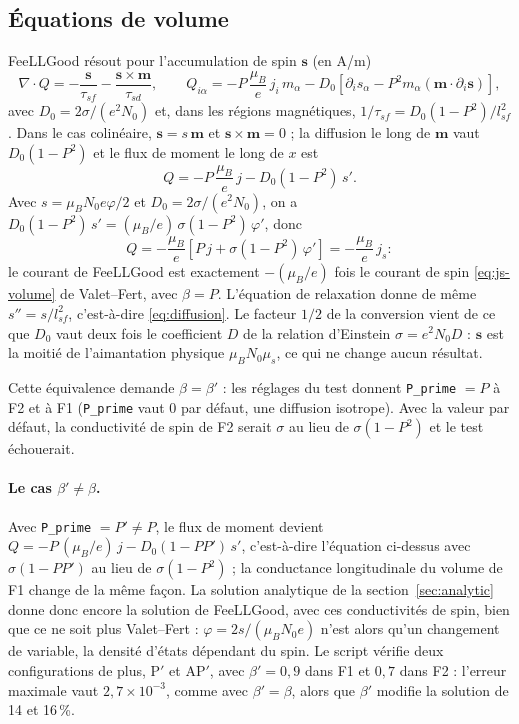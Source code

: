 \documentclass[11pt,a4paper]{article}
\newcommand{\vm}{\bm{m}}
\newcommand{\vs}{\bm{s}}
\begin{document}
\subsection{Équations de volume}
\label{sec:conversion}

FeeLLGood résout pour l'accumulation de spin $\vs$ (en A/m)
\begin{equation}
  \nabla\cdot Q = -\frac{\vs}{\tau_{sf}} - \frac{\vs\times\vm}{\tau_{sd}},
  \qquad
  Q_{i\alpha} = -P\,\frac{\mu_B}{e}\,j_i\,m_\alpha
  - D_0\left[\partial_i s_\alpha - P^2 m_\alpha(\vm\cdot\partial_i\vs)\right],
\end{equation}
avec $D_0 = 2\sigma/(e^2N_0)$ et, dans les régions magnétiques,
$1/\tau_{sf} = D_0(1-P^2)/l_{sf}^2$. Dans le cas colinéaire,
$\vs = s\,\vm$ et $\vs\times\vm = 0$ ; la diffusion le long de $\vm$ vaut
$D_0(1-P^2)$ et le flux de moment le long de $x$ est
\begin{equation}
  Q = -P\,\frac{\mu_B}{e}\,j - D_0(1-P^2)\,s' .
\end{equation}
Avec $s = \mu_BN_0e\varphi/2$ et $D_0 = 2\sigma/(e^2N_0)$, on a
$D_0(1-P^2)\,s' = (\mu_B/e)\,\sigma(1-P^2)\,\varphi'$, donc
\begin{equation}
  Q = -\frac{\mu_B}{e}\left[P\,j + \sigma(1-P^2)\,\varphi'\right]
    = -\frac{\mu_B}{e}\,j_s :
\end{equation}
le courant de FeeLLGood est exactement $-(\mu_B/e)$ fois le courant de spin
\eqref{eq:js-volume} de Valet--Fert, avec $\beta = P$. L'équation de
relaxation donne de même $s'' = s/l_{sf}^2$, c'est-à-dire
\eqref{eq:diffusion}. Le facteur $1/2$ de la conversion vient de ce que
$D_0$ vaut deux fois le coefficient $D$ de la relation d'Einstein
$\sigma = e^2N_0D$ : $\vs$ est la moitié de l'aimantation physique
$\mu_BN_0\mu_s$, ce qui ne change aucun résultat.

Cette équivalence demande $\beta=\beta'$ : les réglages du test donnent
\texttt{P\_prime} $=P$ à F2 et à F1 (\texttt{P\_prime} vaut 0 par
défaut, une diffusion isotrope). Avec la valeur par défaut, la
conductivité de spin de F2 serait $\sigma$ au lieu de $\sigma(1-P^2)$ et
le test échouerait.

\paragraph{Le cas $\beta'\neq\beta$.} Avec \texttt{P\_prime} $=P'\neq P$,
le flux de moment devient $Q = -P\,(\mu_B/e)\,j - D_0(1-PP')\,s'$,
c'est-à-dire l'équation ci-dessus avec $\sigma(1-PP')$ au lieu de
$\sigma(1-P^2)$ ; la conductance longitudinale du volume de F1 change de la
même façon. La solution analytique de la section~\ref{sec:analytic} donne donc encore la
solution de FeeLLGood, avec ces conductivités de spin, bien que ce ne soit
plus Valet--Fert : $\varphi = 2s/(\mu_BN_0e)$ n'est alors qu'un changement
de variable, la densité d'états dépendant du spin. Le script vérifie deux
configurations de plus, P$'$ et AP$'$, avec $\beta' = 0{,}9$ dans F1 et
$0{,}7$ dans F2 : l'erreur maximale vaut $2{,}7\times10^{-3}$, comme avec
$\beta'=\beta$, alors que $\beta'$ modifie la solution de 14 et 16\,\%.
\end{document}
